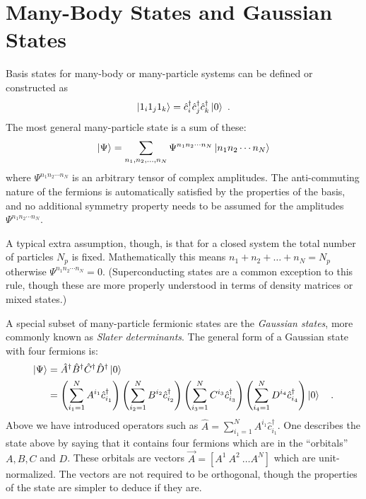 \documentclass[aps, superscriptaddress, floatfix, onecolumn]{revtex4-2}
\begin{document}
\section{Many-Body States and Gaussian States}

Basis states for many-body or many-particle systems can be defined or constructed as
\begin{align}
\ket{1_i 1_j 1_k} = \hat{c}^\dagger_i \hat{c}^\dagger_j \hat{c}^\dagger_k \ket{0} \ .
\end{align}
The most general many-particle state is a sum of these:
\begin{align}
\ket{\Psi} = \sum_{n_1, n_2, \ldots, n_N} \Psi^{n_1 n_2 \cdots n_N} \ket{n_1 n_2 \cdots n_N} \label{eqn:general_state}
\end{align}
where $\Psi^{n_1 n_2 \cdots n_N}$ is an arbitrary tensor of complex amplitudes. The anti-commuting nature of the fermions is automatically satisfied by the properties of the basis, and no additional symmetry property needs to be assumed for the amplitudes $\Psi^{n_1 n_2 \cdots n_N}$. 

A typical extra assumption, though, is that for a closed system the total number of particles $N_p$ is fixed. Mathematically this means $n_1 + n_2 + \ldots + n_N = N_p$ otherwise $\Psi^{n_1 n_2 \cdots n_N} = 0$. (Superconducting states are a common exception to this rule, though these are more properly understood in terms of density matrices or mixed states.)

A special subset of many-particle fermionic states are the \emph{Gaussian states}, more commonly known as \emph{Slater determinants}.
The general form of a Gaussian state with four fermions is:
\begin{align}
\ket{\Psi} & = \hat{A}^\dagger \hat{B}^\dagger \hat{C}^\dagger \hat{D}^\dagger \ket{0} \nonumber \\
& = \left( \sum_{i_1=1}^N A^{i_1} \hat{c}^\dagger_{i_1} \right) \left( \sum_{i_2=1}^N B^{i_2} \hat{c}^\dagger_{i_2} \right) \left( \sum_{i_3=1}^N C^{i_3} \hat{c}^\dagger_{i_3} \right) \left( \sum_{i_4=1}^N D^{i_4} \hat{c}^\dagger_{i_4} \right) \ket{0} \ \ \ .
\end{align}
Above we have introduced operators such as $\hat{A} =  \sum_{i_1=1}^N A^{i_1} \hat{c}^\dagger_{i_1}$. One describes the state above by saying that it contains four fermions which are in the ``orbitals'' $A, B, C$ and $D$. These orbitals are vectors $\vec{A}= [A^1 \ A^2 \ \ldots A^N]$ which are unit-normalized. The vectors are not required to be orthogonal, though the properties of the state are simpler to deduce if they are.
\end{document}
